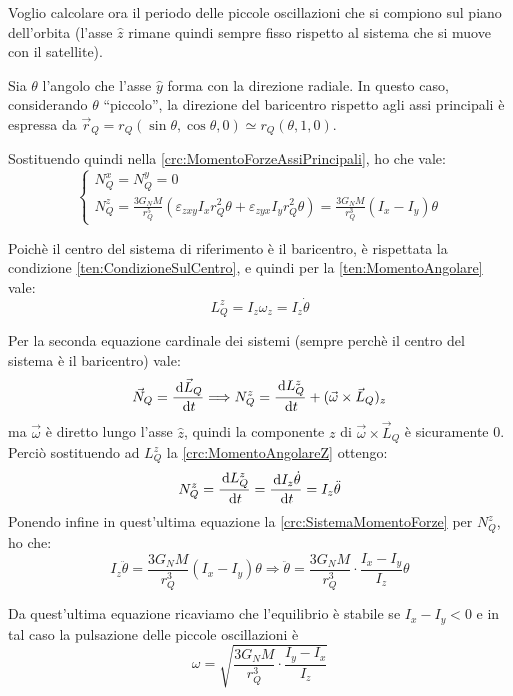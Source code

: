 \documentclass[../main.tex]{subfiles}
\begin{document}
Voglio calcolare ora il periodo delle piccole oscillazioni che si compiono sul piano dell'orbita (l'asse $\hat z$ rimane quindi sempre fisso rispetto al sistema che si muove con il satellite).

Sia $\theta$ l'angolo che l'asse $\hat y$ forma con la direzione radiale. In questo caso, considerando $\theta$ ``piccolo'', la direzione del baricentro rispetto agli assi principali è espressa da $\vec r_Q=r_Q(\sin\theta,\cos\theta,0)\simeq r_Q(\theta,1,0)$.

Sostituendo quindi nella \cref{crc:MomentoForzeAssiPrincipali}, ho che vale:
\begin{equation}\label{crc:SistemaMomentoForze}
\begin{cases}
	N_Q^x=N_Q^y=0\\
	N_Q^z=\frac{3G_N M}{r_Q^5} (\varepsilon_{zxy} I_{x}r_Q^2\theta +\varepsilon_{zyx} I_{y}r_Q^2\theta)=\frac{3G_N M}{r_Q^3}(I_x-I_y)\theta
\end{cases}
\end{equation}

Poichè il centro del sistema di riferimento è il baricentro, è rispettata la condizione \cref{ten:CondizioneSulCentro}, e quindi per la \cref{ten:MomentoAngolare} vale:
\begin{equation}\label{crc:MomentoAngolareZ}
	L_Q^z=I_z\omega_z=I_z\dot\theta
\end{equation}

Per la seconda equazione cardinale dei sistemi (sempre perchè il centro del sistema è il baricentro) vale:
\begin{equation*}
	\vec N_Q=\frac{\,\mathrm{d} \vec L_Q}{\,\mathrm{d} t} \Longrightarrow N_Q^z=\frac{\,\mathrm{d} L_Q^z}{\,\mathrm{d} t}+(\vec \omega \times \vec L_Q)_z
\end{equation*}
ma $\vec \omega$ è diretto lungo l'asse $\hat z$, quindi la componente $z$ di $\vec \omega \times \vec L_Q$ è sicuramente 0. Perciò sostituendo ad $L_Q^z$ la \cref{crc:MomentoAngolareZ} ottengo:
\begin{equation*}
	N_Q^z=\frac{\,\mathrm{d} L_Q^z}{\,\mathrm{d} t}=\frac{\,\mathrm{d} I_z\dot\theta}{\,\mathrm{d} t}=I_z\ddot\theta
\end{equation*}
Ponendo infine in quest'ultima equazione la \cref{crc:SistemaMomentoForze} per $N_Q^z$, ho che:
\begin{equation*}
	I_z\ddot\theta=\frac{3G_N M}{r_Q^3}(I_x-I_y)\theta \Longrightarrow \ddot\theta=\frac{3G_N M}{r_Q^3}\cdot\frac{I_x-I_y}{I_z}\theta
\end{equation*}

Da quest'ultima equazione ricaviamo che l'equilibrio è stabile se $I_x-I_y<0$ e in tal caso la pulsazione delle piccole oscillazioni è
\begin{equation*}
	\omega=\sqrt{\frac{3G_N M}{r_Q^3}\cdot\frac{I_y-I_x}{I_z}}
\end{equation*}
\end{document}
